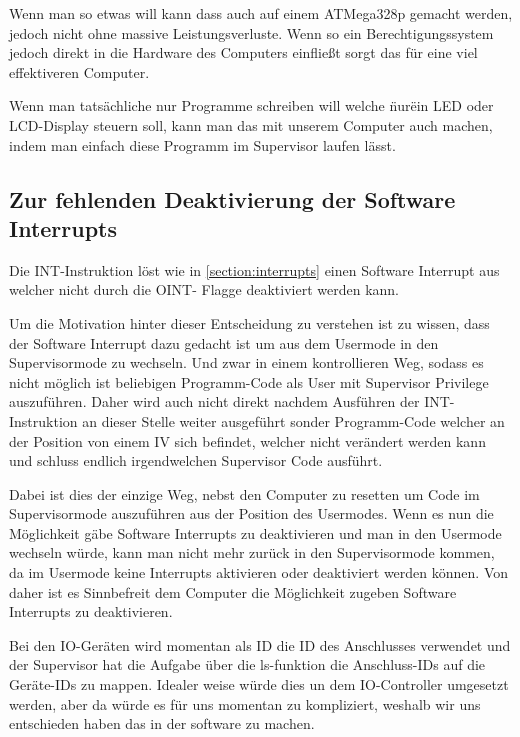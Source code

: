 \documentclass{scrartcl}
\begin{document}
Wenn man so etwas will kann dass auch auf einem ATMega328p gemacht werden, jedoch nicht ohne massive Leistungsverluste.
Wenn so ein Berechtigungssystem jedoch direkt in die Hardware des Computers einfließt sorgt das für eine viel effektiveren Computer.

Wenn man tatsächliche nur Programme schreiben will welche \"nur\" ein LED oder LCD-Display steuern soll, kann man das mit unserem Computer auch machen, indem man einfach diese Programm im Supervisor laufen lässt.

\subsection{\label{com:SoftwareInterrupt}Zur fehlenden Deaktivierung der Software Interrupts}

Die INT-Instruktion löst wie in \autoref{section:interrupts} einen Software Interrupt aus welcher nicht durch die OINT- Flagge deaktiviert werden kann.

Um die Motivation hinter dieser Entscheidung zu verstehen ist zu wissen, dass der Software Interrupt dazu gedacht ist um aus dem Usermode in den Supervisormode zu wechseln.
Und zwar in einem kontrollieren Weg, sodass es nicht möglich ist beliebigen Programm-Code als User mit Supervisor Privilege auszuführen.
Daher wird auch nicht direkt nachdem Ausführen der INT-Instruktion an dieser Stelle weiter ausgeführt sonder Programm-Code welcher an der Position von einem IV sich befindet, welcher nicht verändert werden kann und schluss endlich irgendwelchen Supervisor Code ausführt.

Dabei ist dies der einzige Weg, nebst den Computer zu resetten um Code im Supervisormode auszuführen aus der Position des Usermodes.
Wenn es nun die Möglichkeit gäbe Software Interrupts zu deaktivieren und man in den Usermode wechseln würde, kann man nicht mehr zurück in den Supervisormode kommen, da im Usermode keine Interrupts aktivieren oder deaktiviert werden können.
Von daher ist es Sinnbefreit dem Computer die Möglichkeit zugeben Software Interrupts zu deaktivieren.

Bei den IO-Geräten wird momentan als ID die ID des Anschlusses verwendet und der Supervisor hat die Aufgabe über die ls-funktion die Anschluss-IDs auf die Geräte-IDs zu mappen.
Idealer weise würde dies un dem IO-Controller umgesetzt werden, aber da würde es für uns momentan zu kompliziert, weshalb wir uns entschieden haben das in der software zu machen.

\printbibliography{}
\end{document}
